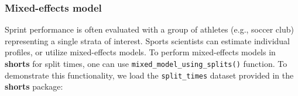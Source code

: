\documentclass[fleqn,10pt]{wlpeerj} %
\begin{document}
\normalsize

\hypertarget{mixed-effects-model}{%
\subsubsection{Mixed-effects model}\label{mixed-effects-model}}

Sprint performance is often evaluated with a group of athletes (e.g., soccer club) representing a single strata of interest. Sports scientists can estimate individual profiles, or utilize mixed-effects models. To perform mixed-effects models in \textbf{shorts} for split times, one can use \texttt{mixed\_model\_using\_splits()} function. To demonstrate this functionality, we load the \texttt{split\_times} dataset provided in the \textbf{shorts} package:

\small
\end{document}
